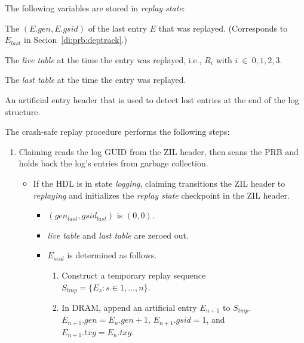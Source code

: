 \documentclass[12pt,a4paper,twoside]{book}
\begin{document}
{The following variables are stored in \textit{replay state}:
\begin{description}[noitemsep,leftmargin=1.5cm,labelindent=1cm]
    \item[$\mathbf{(gen_{last}, gsid_{last})}$] The $(E.gen, E.gsid)$ of the last entry $E$ that was replayed. (Corresponds to $E_{last}$ in Secion~\ref{di:prb:deptrack}.)
    \item[Live Table] The \textit{live table} at the time the entry was replayed, i.e., $R_i$ with $i~\in~{0,1,2,3}$.
    \item[Last Table] The \textit{last table} at the time the entry was replayed.
    \item[$E_{seal}$] An artificial entry header that is used to detect lost entries at the end of the log structure.
\end{description}
The crash-safe replay procedure performs the following steps:
\begin{enumerate}[noitemsep,beginpenalty=100000,midpenalty=100000]
    \item \label{ccReplay:claimscan} Claiming reads the log GUID from the ZIL header, then scans the PRB and holds back the log's entries from garbage collection.
    \begin{itemize}[noitemsep,beginpenalty=100000,midpenalty=100000]
        \item \label{ccReplay:transitionToReplaying} If the HDL is in state \textit{logging}, claiming transitions the ZIL header to \textit{replaying} and initializes the \textit{replay state} checkpoint in the ZIL header.
            \begin{itemize}
                \item $(gen_{last}, gsid_{last})$ is $(0, 0)$.
                \item \textit{live table} and \textit{last table} are zeroed out.
                \item $E_{seal}$ is determined as follows.
                \begin{enumerate}
                    \item Construct a temporary replay sequence \\ \mbox{$S_{tmp} = \{E_s : s \in 1, \dots, n\}$}.
                    \item In DRAM, append an artificial entry $E_{n+1}$ to $S_{tmp}$. \\
                        \mbox{$E_{n+1}.gen = E_{n}.gen + 1$}, \mbox{$E_{n+1}.gsid = 1$}, and \\
                        \mbox{$E_{n+1}.txg = E_{n}.txg$}.

\end{enumerate}
\end{itemize}
\end{itemize}
\end{enumerate}}
\end{document}
